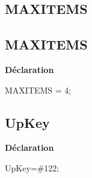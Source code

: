 \documentclass{report}
\newif\ifpdf
\begin{document}
\subsection*{\large{\textbf{MAXITEMS}}\normalsize\hspace{1ex}\hrulefill}
\else
\subsection*{MAXITEMS}
\fi
\label{Types-MAXITEMS}
\begin{list}{}{
\setlength{\itemindent}{0cm}
\setlength{\listparindent}{0cm}
\setlength{\leftmargin}{\evensidemargin}
\addtolength{\leftmargin}{\tmplength}
\settowidth{\labelsep}{X}
\addtolength{\leftmargin}{\labelsep}
\setlength{\labelwidth}{\tmplength}
}
\item[\textbf{Déclaration}\hfill]
\ifpdf
\begin{flushleft}
\fi
\begin{ttfamily}
MAXITEMS = 4;\end{ttfamily}

\ifpdf
\end{flushleft}
\fi

\end{list}
\ifpdf
\subsection*{\large{\textbf{UpKey}}\normalsize\hspace{1ex}\hrulefill}
\else
\subsection*{UpKey}
\fi
\label{Types-UpKey}
\begin{list}{}{
\setlength{\itemindent}{0cm}
\setlength{\listparindent}{0cm}
\setlength{\leftmargin}{\evensidemargin}
\addtolength{\leftmargin}{\tmplength}
\settowidth{\labelsep}{X}
\addtolength{\leftmargin}{\labelsep}
\setlength{\labelwidth}{\tmplength}
}
\item[\textbf{Déclaration}\hfill]
\ifpdf
\begin{flushleft}
\fi
\begin{ttfamily}
UpKey={\#}122;\end{ttfamily}

\ifpdf
\end{flushleft}
\fi

\end{list}
\ifpdf
\end{document}
